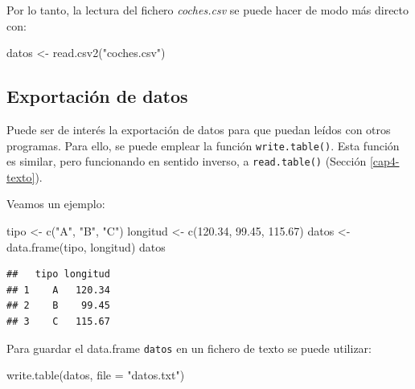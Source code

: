 \documentclass[
]{book}
\newenvironment{Shaded}{\begin{snugshade}}{\end{snugshade}}
\newcommand{\AttributeTok}[1]{\textcolor[rgb]{0.77,0.63,0.00}{#1}}
\newcommand{\FloatTok}[1]{\textcolor[rgb]{0.00,0.00,0.81}{#1}}
\newcommand{\FunctionTok}[1]{\textcolor[rgb]{0.00,0.00,0.00}{#1}}
\newcommand{\NormalTok}[1]{#1}
\newcommand{\OtherTok}[1]{\textcolor[rgb]{0.56,0.35,0.01}{#1}}
\newcommand{\StringTok}[1]{\textcolor[rgb]{0.31,0.60,0.02}{#1}}
\theoremstyle{break}
\theoremstyle{nonumberplain}
\begin{document}
Por lo tanto, la lectura del fichero \emph{coches.csv} se puede hacer de modo
más directo con:

\begin{Shaded}
\begin{Highlighting}[]
\NormalTok{datos }\OtherTok{\textless{}{-}} \FunctionTok{read.csv2}\NormalTok{(}\StringTok{"coches.csv"}\NormalTok{)}
\end{Highlighting}
\end{Shaded}

\hypertarget{exportaciuxf3n-de-datos}{%
\subsection{Exportación de datos}\label{exportaciuxf3n-de-datos}}

Puede ser de interés la
exportación de datos para que puedan leídos con otros programas. Para
ello, se puede emplear la función \texttt{write.table()}. Esta función es
similar, pero funcionando en sentido inverso, a \texttt{read.table()}
(Sección \ref{cap4-texto}).

Veamos un ejemplo:

\begin{Shaded}
\begin{Highlighting}[]
\NormalTok{tipo }\OtherTok{\textless{}{-}} \FunctionTok{c}\NormalTok{(}\StringTok{"A"}\NormalTok{, }\StringTok{"B"}\NormalTok{, }\StringTok{"C"}\NormalTok{)}
\NormalTok{longitud }\OtherTok{\textless{}{-}} \FunctionTok{c}\NormalTok{(}\FloatTok{120.34}\NormalTok{, }\FloatTok{99.45}\NormalTok{, }\FloatTok{115.67}\NormalTok{)}
\NormalTok{datos }\OtherTok{\textless{}{-}} \FunctionTok{data.frame}\NormalTok{(tipo, longitud)}
\NormalTok{datos}
\end{Highlighting}
\end{Shaded}

\begin{verbatim}
##   tipo longitud
## 1    A   120.34
## 2    B    99.45
## 3    C   115.67
\end{verbatim}

Para guardar el data.frame \texttt{datos} en un fichero de texto se
puede utilizar:

\begin{Shaded}
\begin{Highlighting}[]
\FunctionTok{write.table}\NormalTok{(datos, }\AttributeTok{file =} \StringTok{"datos.txt"}\NormalTok{)}
\end{Highlighting}
\end{Shaded}
\end{document}

